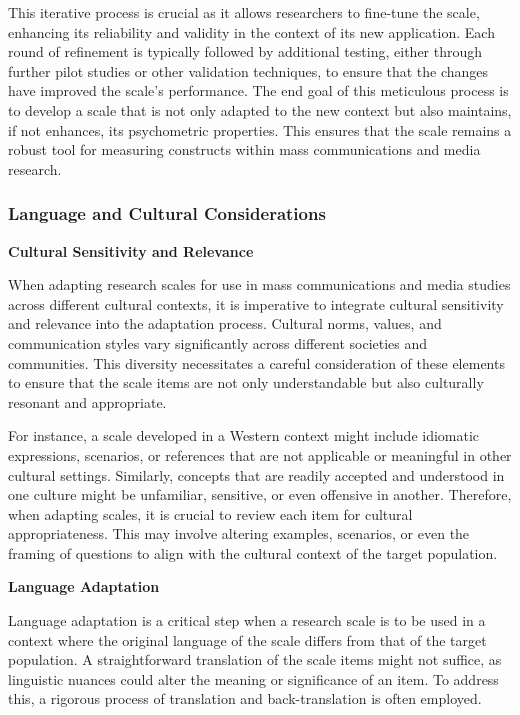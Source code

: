 \documentclass[
]{book}
\begin{document}
This iterative process is crucial as it allows researchers to fine-tune the scale, enhancing its reliability and validity in the context of its new application. Each round of refinement is typically followed by additional testing, either through further pilot studies or other validation techniques, to ensure that the changes have improved the scale's performance. The end goal of this meticulous process is to develop a scale that is not only adapted to the new context but also maintains, if not enhances, its psychometric properties. This ensures that the scale remains a robust tool for measuring constructs within mass communications and media research.

\subsubsection*{Language and Cultural Considerations}\label{language-and-cultural-considerations}

\textbf{Cultural Sensitivity and Relevance}

When adapting research scales for use in mass communications and media studies across different cultural contexts, it is imperative to integrate cultural sensitivity and relevance into the adaptation process. Cultural norms, values, and communication styles vary significantly across different societies and communities. This diversity necessitates a careful consideration of these elements to ensure that the scale items are not only understandable but also culturally resonant and appropriate.

For instance, a scale developed in a Western context might include idiomatic expressions, scenarios, or references that are not applicable or meaningful in other cultural settings. Similarly, concepts that are readily accepted and understood in one culture might be unfamiliar, sensitive, or even offensive in another. Therefore, when adapting scales, it is crucial to review each item for cultural appropriateness. This may involve altering examples, scenarios, or even the framing of questions to align with the cultural context of the target population.

\textbf{Language Adaptation}

Language adaptation is a critical step when a research scale is to be used in a context where the original language of the scale differs from that of the target population. A straightforward translation of the scale items might not suffice, as linguistic nuances could alter the meaning or significance of an item. To address this, a rigorous process of translation and back-translation is often employed.
\end{document}
